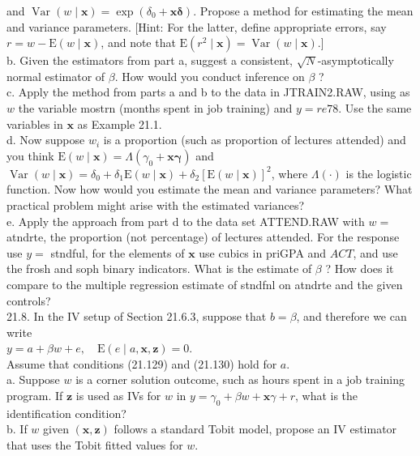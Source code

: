 \documentclass[10pt]{article}
\begin{document}
and $\operatorname{Var}(w \mid \mathbf{x})=\exp \left(\delta_{0}+\mathbf{x} \boldsymbol{\delta}\right)$. Propose a method for estimating the mean and variance parameters. [Hint: For the latter, define appropriate errors, say $r=w-\mathrm{E}(w \mid \mathbf{x})$, and note that $\mathrm{E}\left(r^{2} \mid \mathbf{x}\right)=\operatorname{Var}(w \mid \mathbf{x})$.]\\
b. Given the estimators from part a, suggest a consistent, $\sqrt{N}$-asymptotically normal estimator of $\beta$. How would you conduct inference on $\beta$ ?\\
c. Apply the method from parts a and b to the data in JTRAIN2.RAW, using as $w$ the variable mostrn (months spent in job training) and $y=r e 78$. Use the same variables in $\mathbf{x}$ as Example 21.1.\\
d. Now suppose $w_{i}$ is a proportion (such as proportion of lectures attended) and you think $\mathrm{E}(w \mid \mathbf{x})=\Lambda\left(\gamma_{0}+\mathbf{x} \boldsymbol{\gamma}\right)$ and $\operatorname{Var}(w \mid \mathbf{x})=\delta_{0}+\delta_{1} \mathrm{E}(w \mid \mathbf{x})+\delta_{2}[\mathrm{E}(w \mid \mathbf{x})]^{2}$, where $\Lambda(\cdot)$ is the logistic function. Now how would you estimate the mean and variance parameters? What practical problem might arise with the estimated variances?\\
e. Apply the approach from part d to the data set ATTEND.RAW with $w=$ atndrte, the proportion (not percentage) of lectures attended. For the response use $y=$ stndful, for the elements of $\mathbf{x}$ use cubics in priGPA and $A C T$, and use the frosh and soph binary indicators. What is the estimate of $\beta$ ? How does it compare to the multiple regression estimate of stndfnl on atndrte and the given controls?\\
21.8. In the IV setup of Section 21.6.3, suppose that $b=\beta$, and therefore we can write\\
$y=a+\beta w+e, \quad \mathrm{E}(e \mid a, \mathbf{x}, \mathbf{z})=0$.\\
Assume that conditions (21.129) and (21.130) hold for $a$.\\
a. Suppose $w$ is a corner solution outcome, such as hours spent in a job training program. If $\mathbf{z}$ is used as IVs for $w$ in $y=\gamma_{0}+\beta w+\mathbf{x} \gamma+r$, what is the identification condition?\\
b. If $w$ given $(\mathbf{x}, \mathbf{z})$ follows a standard Tobit model, propose an IV estimator that uses the Tobit fitted values for $w$.\\
\end{document}
